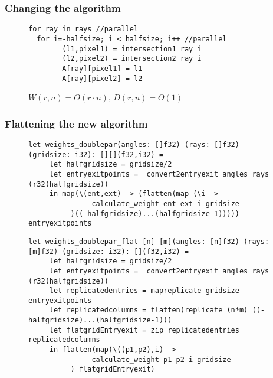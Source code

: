 \documentclass{beamer}
\begin{document}
\begin{frame}[fragile]
\frametitle{Changing the algorithm}
\begin{figure}[!h]
\begin{lstlisting}[frame=single]
for ray in rays //parallel
  for i=-halfsize; i < halfsize; i++ //parallel
        (l1,pixel1) = intersection1 ray i
        (l2,pixel2) = intersection2 ray i
        A[ray][pixel1] = l1
        A[ray][pixel2] = l2
\end{lstlisting}
  \caption{$W(r,n)=O(r\cdot n)$, $D(r,n)=O(1)$}
\end{figure}
\end{frame}

\begin{frame}[fragile]
\frametitle{Flattening the new algorithm}
\begin{figure}[!h]
\begin{lstlisting}[frame=single, language=Futhark,basicstyle=\tiny]
let weights_doublepar(angles: []f32) (rays: []f32) (gridsize: i32): [][](f32,i32) =
     let halfgridsize = gridsize/2
     let entryexitpoints =  convert2entryexit angles rays (r32(halfgridsize))
     in map(\(ent,ext) -> (flatten(map (\i ->
               calculate_weight ent ext i gridsize
          )((-halfgridsize)...(halfgridsize-1))))) entryexitpoints
\end{lstlisting}
\begin{lstlisting}[frame=single, language=Futhark,basicstyle=\tiny]
let weights_doublepar_flat [n] [m](angles: [n]f32) (rays: [m]f32) (gridsize: i32): [](f32,i32) =
     let halfgridsize = gridsize/2
     let entryexitpoints =  convert2entryexit angles rays (r32(halfgridsize))
     let replicatedentries = mapreplicate gridsize entryexitpoints
     let replicatedcolumns = flatten(replicate (n*m) ((-halfgridsize)...(halfgridsize-1)))
     let flatgridEntryexit = zip replicatedentries replicatedcolumns
     in flatten(map(\((p1,p2),i) ->
               calculate_weight p1 p2 i gridsize
          ) flatgridEntryexit)
\end{lstlisting}
\end{figure}
\end{frame}

 \begin{frame}
 \nocite{*}
 
 
 \end{frame}
\end{document}
